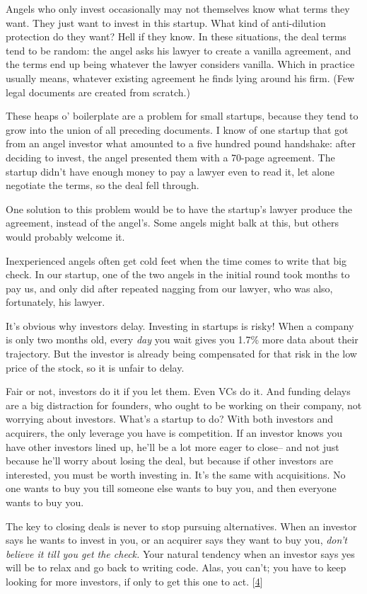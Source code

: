 Angels who only invest occasionally may not themselves know what terms
they want. They just want to invest in this startup. What kind of
anti-dilution protection do they want? Hell if they know. In these
situations, the deal terms tend to be random: the angel asks his lawyer
to create a vanilla agreement, and the terms end up being whatever the
lawyer considers vanilla. Which in practice usually means, whatever
existing agreement he finds lying around his firm. (Few legal documents
are created from scratch.)

These heaps o' boilerplate are a problem for small startups, because
they tend to grow into the union of all preceding documents. I know of
one startup that got from an angel investor what amounted to a five
hundred pound handshake: after deciding to invest, the angel presented
them with a 70-page agreement. The startup didn't have enough money to
pay a lawyer even to read it, let alone negotiate the terms, so the deal
fell through.

One solution to this problem would be to have the startup's lawyer
produce the agreement, instead of the angel's. Some angels might balk at
this, but others would probably welcome it.

Inexperienced angels often get cold feet when the time comes to write
that big check. In our startup, one of the two angels in the initial
round took months to pay us, and only did after repeated nagging from
our lawyer, who was also, fortunately, his lawyer.

It's obvious why investors delay. Investing in startups is risky! When a
company is only two months old, every \emph{day} you wait gives you
1.7\% more data about their trajectory. But the investor is already
being compensated for that risk in the low price of the stock, so it is
unfair to delay.

Fair or not, investors do it if you let them. Even VCs do it. And
funding delays are a big distraction for founders, who ought to be
working on their company, not worrying about investors. What's a startup
to do? With both investors and acquirers, the only leverage you have is
competition. If an investor knows you have other investors lined up,
he'll be a lot more eager to close-- and not just because he'll worry
about losing the deal, but because if other investors are interested,
you must be worth investing in. It's the same with acquisitions. No one
wants to buy you till someone else wants to buy you, and then everyone
wants to buy you.

The key to closing deals is never to stop pursuing alternatives. When an
investor says he wants to invest in you, or an acquirer says they want
to buy you, \emph{don't believe it till you get the check.} Your natural
tendency when an investor says yes will be to relax and go back to
writing code. Alas, you can't; you have to keep looking for more
investors, if only to get this one to act. {[}\hyperref[f4n]{4}{]}

